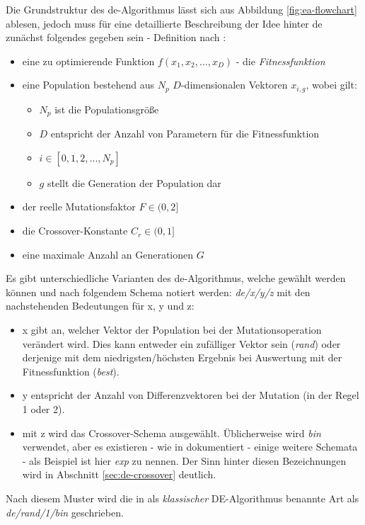 		Die Grundstruktur des \gls{de}-Algorithmus lässt sich aus Abbildung \ref{fig:ea-flowchart} ablesen, jedoch muss für eine detaillierte Beschreibung der Idee hinter \gls{de} zunächst folgendes gegeben sein - Definition nach \cite{storn-price-de}:
		\begin{itemize}
			\item eine zu optimierende Funktion $f(x_{1}, x_{2}, ... , x_{D})$ - die \textit{Fitnessfunktion}
			\item eine Population bestehend aus $N_{p}$ $D$-dimensionalen Vektoren $x_{i, g}$, wobei gilt:
			\begin{itemize}
				\item $N_{p}$ ist die Populationsgröße
				\item $D$ entspricht der Anzahl von Parametern für die Fitnessfunktion
				\item $i \in [0,1,2, ... , N_{p}]$
				\item $g$ stellt die Generation der Population dar
			\end{itemize}
			\item der reelle Mutationsfaktor $F \in (0,2]$
			\item die Crossover-Konstante $C_{r} \in (0,1]$
			\item eine maximale Anzahl an Generationen $G$
		\end{itemize}
		
		Es gibt unterschiedliche Varianten des \gls{de}-Algorithmus, welche gewählt werden können und nach folgendem Schema notiert werden: \textit{\gls{de}/x/y/z} mit den nachstehenden Bedeutungen für x, y und z:
		\begin{itemize}
			\item x gibt an, welcher Vektor der Population bei der Mutationsoperation verändert wird. Dies kann entweder ein zufälliger Vektor sein (\textit{rand}) oder derjenige mit dem niedrigsten/höchsten Ergebnis bei Auswertung mit der Fitnessfunktion (\textit{best}).
			\item y entspricht der Anzahl von Differenzvektoren bei der Mutation (in der Regel 1 oder 2).
			\item mit z wird das Crossover-Schema ausgewählt. Üblicherweise wird \textit{bin} verwendet, aber es existieren - wie in \mbox{\cite[Seiten 93-97]{storn-price-de-book}} dokumentiert - einige weitere Schemata - als Beispiel ist hier \textit{exp} zu nennen. Der Sinn hinter diesen Bezeichnungen wird in Abschnitt \ref{sec:de-crossover} deutlich.
		\end{itemize}
		Nach diesem Muster wird die in \cite[Seite 47]{storn-price-de-book} als \textit{klassischer} DE-Algorithmus benannte Art als \textit{\gls{de}/rand/1/bin} geschrieben.
		
